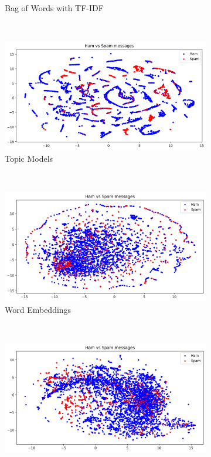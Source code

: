 \documentclass[letterpaper]{article}
\begin{document}
\begin{figure}[p]
\begin{subfigure}[t]{0.5\textwidth}
		\caption{Bag of Words with TF-IDF}
		\label{fig: tfidf}
	\end{subfigure}%
	~ 
	\begin{subfigure}[t]{0.5\textwidth}
		\centering
		\includegraphics[width = 0.95 \linewidth]{./plot_representations/topics.png}
		\caption{Topic Models}
		\label{fig: topics}
	\end{subfigure}
	~
	\begin{subfigure}[t]{0.5\textwidth}
		\centering
		\includegraphics[width = 0.95 \linewidth]{./plot_representations/word_emb.png}
		\caption{Word Embeddings}
		\label{fig: word_emb}
	\end{subfigure}%
	~ 
	\begin{subfigure}[t]{0.5\textwidth}
		\centering
		\includegraphics[width = 0.95 \linewidth]{./plot_representations/sent_emb.png}

\end{subfigure}
\end{figure}
\end{document}

